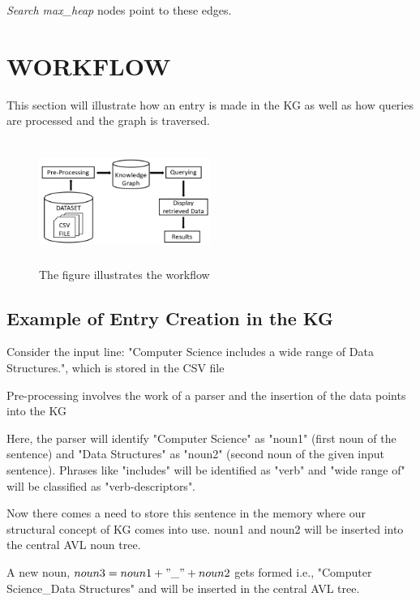 \documentclass[conference]{IEEEtran}
\begin{document}
\textit{Search max\_heap} nodes point to these edges.


\section{WORKFLOW}


This section will illustrate how an entry is made in the KG as well as how queries are processed and the graph is traversed.

\begin{figure}[htbp]
\centerline{\includegraphics[width=0.5\textwidth , height=4cm]{workflow_5.png}}
\caption{The figure illustrates the workflow}
\label{fig}
\end{figure}
\subsection{\textbf{Example of Entry Creation in the KG}}

Consider the input line: "Computer Science includes a wide range of Data Structures.", which is stored in the CSV file

Pre-processing involves the work of a parser and the insertion of the data points into the KG

Here, the parser will identify "Computer Science" as "noun1" (first noun of the sentence)
and "Data Structures" as "noun2" (second noun of the given input sentence).
Phrases like "includes" will be identified as "verb" and "wide range of" will be classified as "verb-descriptors".

Now there comes a need to store this sentence in the memory where our structural concept
of KG comes into use.
noun1 and noun2 will be inserted into the central AVL noun
tree.

A new noun, $noun3 = noun1 + "\_" + noun2$ gets formed i.e., "Computer Science\_Data Structures"
and will be inserted in the central AVL tree.
\end{document}
